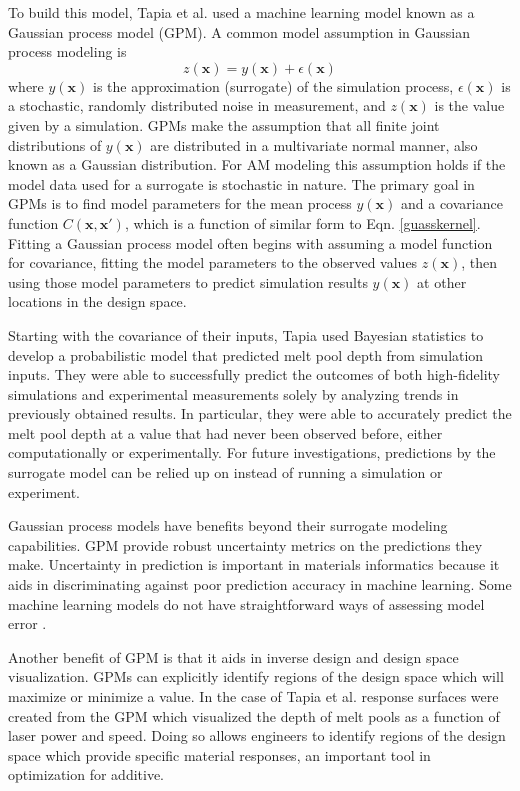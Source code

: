 To build this model, Tapia et al. used a machine learning model known as a Gaussian process model (GPM). A common model assumption in Gaussian process modeling is
\begin{equation}
	z(\mathbf{x}) = y(\mathbf{x}) + \epsilon(\mathbf{x})
	\label{model}
\end{equation}
where $y(\mathbf{x})$ is the approximation (surrogate) of the simulation process, $\epsilon(\mathbf{x})$ is a stochastic, randomly distributed noise in measurement, and $z(\mathbf{x})$ is the value given by a simulation. GPMs make the assumption that all finite joint distributions of $y(\mathbf{x})$ are distributed in a multivariate normal manner, also known as a Gaussian distribution. For AM modeling this assumption holds if the model data used for a surrogate is stochastic in nature. The primary goal in GPMs is to find model parameters for the mean process $y(\mathbf{x})$ and a covariance function $C(\mathbf{x},\mathbf{x}')$, which is a function of similar form to Eqn. \ref{guasskernel}. Fitting a Gaussian process model often begins with assuming a model function for covariance, fitting the model parameters to the observed values $z(\mathbf{x})$, then using those model parameters to predict simulation results $y(\mathbf{x})$ at other locations in the design space. 

Starting with the covariance of their inputs, Tapia used Bayesian statistics to develop a probabilistic model that predicted melt pool depth from simulation inputs. They were able to successfully predict the outcomes of both high-fidelity simulations and experimental measurements solely by analyzing trends in previously obtained results. In particular, they were able to accurately predict the melt pool depth at a value that had never been observed before, either computationally or experimentally. For future investigations, predictions by the surrogate model can be relied up on instead of running a simulation or experiment. 

Gaussian process models have benefits beyond their surrogate modeling capabilities. GPM provide robust uncertainty metrics on the predictions they make. Uncertainty in prediction is important in materials informatics because it aids in discriminating against poor prediction accuracy in machine learning. Some machine learning models do not have straightforward ways of assessing model error \cite{Bessa2017}. 

Another benefit of GPM is that it aids in inverse design and design space visualization. GPMs can explicitly identify regions of the design space which will maximize or minimize a value. In the case of Tapia et al. response surfaces were created from the GPM which visualized the depth of melt pools as a function of laser power and speed. Doing so allows engineers to identify regions of the design space which provide specific material responses, an important tool in optimization for additive.

